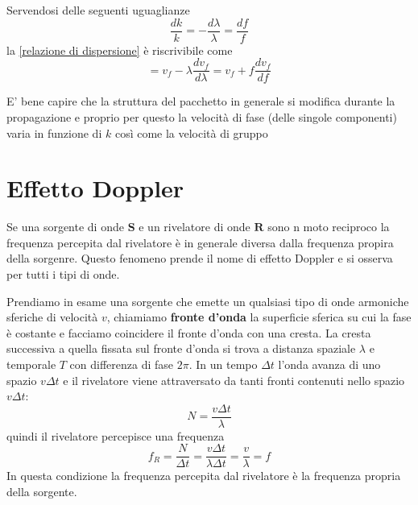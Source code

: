\documentclass[x11names]{report}
\begin{document}
		\begin{es}{}
			Servendosi delle seguenti uguaglianze
			\[ 
			\boxed{\frac{dk}{k}} = \boxed{-\frac{d\lambda}{\lambda}} = \boxed{\frac{df}{f}}
			\]
			la \ref{relazione di dispersione} è riscrivibile come 
			\[ 
			= v_f - \lambda \frac{dv_f}{d\lambda} = v_f + f\frac{dv_f}{df}
			\]
		\end{es}
		
		E' bene capire che la struttura del pacchetto in generale si modifica durante la propagazione e proprio per questo la velocità di fase (delle singole componenti) varia in funzione di \(k\) così come la velocità di gruppo
	\newpage
	\section{Effetto Doppler}
	Se una sorgente di onde \(\boldsymbol{S}\) e un rivelatore di onde \(\boldsymbol{R}\) sono n moto reciproco la frequenza percepita dal rivelatore è in generale diversa dalla frequenza propira della sorgenre. Questo fenomeno prende il nome di effetto Doppler e si osserva per tutti i tipi di onde.
	
	Prendiamo in esame una sorgente che emette un qualsiasi tipo di onde armoniche sferiche di velocità \(v\), chiamiamo \textbf{fronte d'onda} la superficie sferica su cui la fase è costante e facciamo coincidere il fronte d'onda con una cresta. La cresta successiva a quella fissata sul fronte d'onda si trova a distanza spaziale \(\lambda\) e temporale \(T\) con differenza di fase \(2\pi \). In un tempo \(\Delta t\) l'onda avanza di uno spazio \(v\Delta t\) e il rivelatore viene attraversato da tanti fronti contenuti nello spazio \(v\Delta t\): 
	\[ 
	N = \frac{v\Delta t}{\lambda}
	\]
	quindi il rivelatore percepisce una frequenza
	\[
	f_R = \frac{N}{\Delta t}= \frac{v\Delta t}{\lambda \Delta t} = \frac{v}{\lambda} = f
	\]
	In questa condizione la frequenza percepita dal rivelatore è la frequenza propria della sorgente.
	
\end{document}
